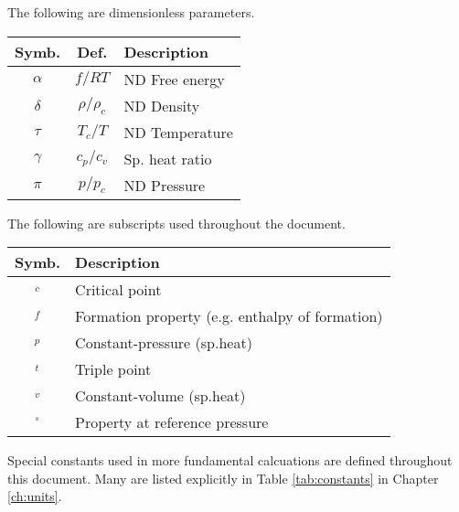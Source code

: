 The following are dimensionless parameters.

\vspace{1em}
\begin{tabular}{|ccl|}
\hline
Symb. & Def. & Description\\
\hline
$\alpha$ & $f / RT$ & ND Free energy\\
$\delta$ & $\rho/\rho_c$ & ND Density\\
$\tau$ & $T_c / T$ & ND Temperature\\
$\gamma$ & $c_p / c_v$ & Sp. heat ratio\\
$\pi$ & $p / p_c$ & ND Pressure\\
\hline
\end{tabular}
\vspace{1em}

The following are subscripts used throughout the document.

\vspace{1em}
\begin{tabular}{|cl|}
\hline
Symb. & Description\\
\hline
$_c$ & Critical point\\
$_f$ & Formation property (e.g. enthalpy of formation)\\
$_p$ & Constant-pressure (sp.heat)\\
$_t$ & Triple point\\
$_v$ & Constant-volume (sp.heat)\\
$^\circ$ & Property at reference pressure\\
\hline
\end{tabular}

Special constants used in more fundamental calcuations are defined throughout this document.  Many are listed explicitly in Table \ref{tab:constants} in Chapter \ref{ch:units}.

